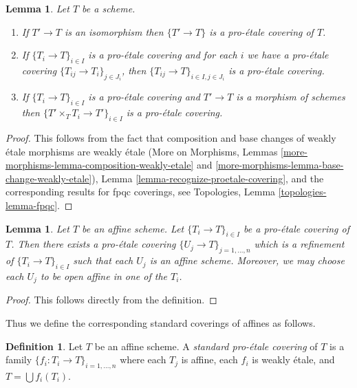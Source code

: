\documentclass{stacks-project}
\theoremstyle{plain}
\newtheorem{lemma}[subsection]{Lemma}
\theoremstyle{definition}
\newtheorem{definition}[subsection]{Definition}
\theoremstyle{remark}
\numberwithin{equation}{subsection}
\begin{document}
\begin{lemma}
\label{lemma-proetale}
Let $T$ be a scheme.
\begin{enumerate}
\item If $T' \to T$ is an isomorphism then $\{T' \to T\}$
is a pro-\'etale covering of $T$.
\item If $\{T_i \to T\}_{i\in I}$ is a pro-\'etale covering and for each
$i$ we have a pro-\'etale covering $\{T_{ij} \to T_i\}_{j\in J_i}$, then
$\{T_{ij} \to T\}_{i \in I, j\in J_i}$ is a pro-\'etale covering.
\item If $\{T_i \to T\}_{i\in I}$ is a pro-\'etale covering
and $T' \to T$ is a morphism of schemes then
$\{T' \times_T T_i \to T'\}_{i\in I}$ is a pro-\'etale covering.
\end{enumerate}
\end{lemma}

\begin{proof}
This follows from the fact that composition and base changes
of weakly \'etale morphisms are weakly \'etale
(More on Morphisms, Lemmas
\ref{more-morphisms-lemma-composition-weakly-etale} and
\ref{more-morphisms-lemma-base-change-weakly-etale}),
Lemma \ref{lemma-recognize-proetale-covering}, and
the corresponding results for fpqc coverings, see
Topologies, Lemma \ref{topologies-lemma-fpqc}.
\end{proof}

\begin{lemma}
\label{lemma-proetale-affine}
Let $T$ be an affine scheme. Let $\{T_i \to T\}_{i \in I}$ be a pro-\'etale
covering of $T$. Then there exists a pro-\'etale covering
$\{U_j \to T\}_{j = 1, \ldots, n}$ which is a refinement
of $\{T_i \to T\}_{i \in I}$ such that each $U_j$ is an affine
scheme. Moreover, we may choose each $U_j$ to be open affine
in one of the $T_i$.
\end{lemma}

\begin{proof}
This follows directly from the definition.
\end{proof}

\noindent
Thus we define the corresponding standard coverings of affines as follows.

\begin{definition}
\label{definition-standard-proetale}
Let $T$ be an affine scheme. A {\it standard pro-\'etale covering}
of $T$ is a family $\{f_i : T_i \to T\}_{i = 1, \ldots, n}$
where each $T_j$ is affine, each $f_i$ is weakly \'etale, and
$T = \bigcup f_i(T_i)$.
\end{definition}
\end{document}
